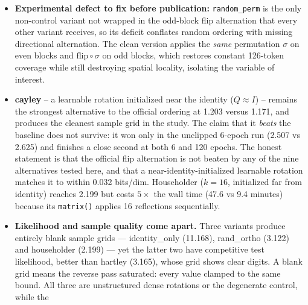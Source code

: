 \documentclass[11pt]{article}
\begin{document}
\begin{itemize}
        receiving \emph{zero} context in all four blocks. Since bits/dim is
        a sum over tokens and the cost of missing context is convex, the
        starved tokens dominate. That std ordering ($0 < 36.3 < 73.9$)
        reproduces the measured bpd ordering ($1.171 < 2.157 < 11.168$).
        Positional embeddings are \emph{not} the mechanism: the official
        implementation permutes the embedding table alongside the tokens, so
        each token keeps its own embedding under any ordering.
  \item \textbf{Experimental defect to fix before publication:}
        \texttt{random\_perm} is the only non-control variant not wrapped in
        the odd-block flip alternation that every other variant receives, so
        its deficit conflates random ordering with missing directional
        alternation. The clean version applies the \emph{same} permutation
        $\sigma$ on even blocks and $\mathrm{flip}\circ\sigma$ on odd
        blocks, which restores constant 126-token coverage while still
        destroying spatial locality, isolating the variable of interest.
  \item \textbf{cayley} -- a learnable rotation initialized near the
        identity ($Q\approx I$) -- remains the strongest alternative to the
        official ordering at 1.203 versus 1.171, and produces the cleanest
        sample grid in the study. The claim that it \emph{beats} the
        baseline does not survive: it won only in the unclipped 6-epoch run
        (2.507 vs 2.625) and finishes a close second at both 6 and 120
        epochs. The honest statement is that the official flip alternation
        is not beaten by any of the nine alternatives tested here, and that
        a near-identity-initialized learnable rotation matches it to within
        0.032 bits/dim. Householder ($k=16$, initialized far from identity)
        reaches 2.199 but costs $5\times$ the wall time (47.6 vs 9.4
        minutes) because its \texttt{matrix()} applies 16 reflections
        sequentially.
  \item \textbf{Likelihood and sample quality come apart.} Three variants
        produce entirely blank sample grids --- identity\_only (11.168),
        rand\_ortho (3.122) and householder (2.199) --- yet the latter two
        have competitive test likelihood, better than hartley (3.165), whose
        grid shows clear digits. A blank grid means the reverse pass
        saturated: every value clamped to the same bound. All three are
        unstructured dense rotations or the degenerate control, while the

\end{itemize}
\end{document}
